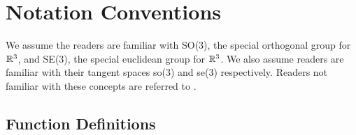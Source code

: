 \section{Notation Conventions}
\label{chModels.sec.notation}

We assume the readers are familiar with SO(3), the special orthogonal
group for $\mathbb{R}^{3}$, and SE(3), the special euclidean group for
$\mathbb{R}^{3}$.  We also assume readers are familiar with their tangent
spaces so(3) and se(3) respectively.  Readers not familiar with these
concepts are referred to \cite{murray&li&sastry}.

\subsection{Function Definitions}
\label{chModels.sec.functionDefn}

